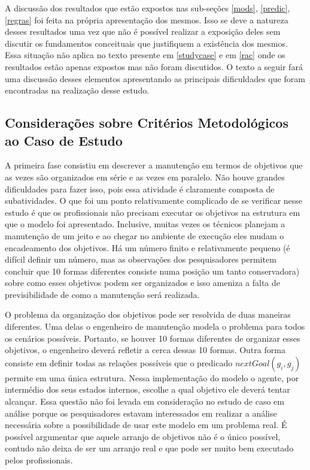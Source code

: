 A discussão dos resultados que estão expostos nas sub-seções \ref{mods}, \ref{predic}, \ref{regras} foi feita na própria apresentação dos mesmos. Isso se deve a natureza desses resultados uma vez que não é possível realizar a exposição deles sem discutir os fundamentos conceituais que justifiquem a existência dos mesmos. Essa situação não aplica no texto presente em \ref{studycase} e em \ref{rac} onde os resultados estão apenas expostos mas não foram discutidos. O texto a seguir fará uma discussão desses elementos apresentando as principais dificuldades que foram encontradas na realização desse estudo. 

\subsection{Considerações sobre Critérios Metodológicos ao Caso de Estudo}

A primeira fase consistiu em descrever a manutenção em termos de objetivos que as vezes são organizados em série e as vezes em paralelo. Não houve grandes dificuldades para fazer isso, pois essa atividade é claramente composta de subatividades. O que foi um ponto relativamente complicado de se verificar nesse estudo é que os profissionais não precisam executar os objetivos na estrutura em que o modelo foi apresentado. Inclusive, muitas vezes os técnicos planejam a manutenção de um jeito e ao chegar no ambiente de execução eles mudam o encadeamento dos objetivos. Há um número finito e relativamente pequeno (é difícil definir um número, mas as observações dos pesquisadores permitem concluir que 10 formas diferentes consiste numa posição um tanto conservadora) sobre como esses objetivos podem ser organizados e isso ameniza a falta de previsibilidade de como a manutenção será realizada. 

O problema da organização dos objetivos pode ser resolvida de duas maneiras diferentes. Uma delas o engenheiro de manutenção modela o problema para todos os cenários possíveis. Portanto, se houver 10 formas diferentes de organizar esses objetivos, o engenheiro deverá refletir a cerca dessas 10 formas. Outra forma consiste em definir todas as relações possíveis que o predicado $nextGoal(g_i,g_j)$ permite em uma única estrutura. Nessa implementação do modelo o agente, por intermédio dos seus estados internos, escolhe a qual objetivo ele deverá tentar alcançar. Essa questão não foi levada em consideração no estudo de caso em análise porque os pesquisadores estavam interessados em realizar a análise necessária sobre a possibilidade de usar este modelo em um problema real. É possível argumentar que aquele arranjo de objetivos não é o único possível, contudo não deixa de ser um arranjo real e que pode ser muito bem executado pelos profissionais. 

